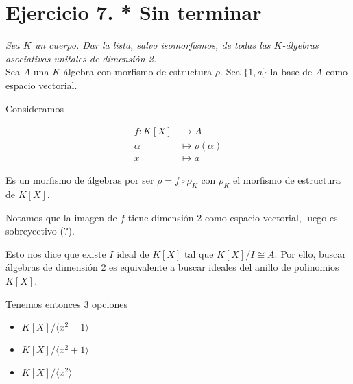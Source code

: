 \section{Ejercicio 7. * Sin terminar} \emph{Sea \(K\) un cuerpo. Dar la lista, salvo isomorfismos, de
todas las \(K\)-álgebras asociativas unitales de dimensión 2.}\\

Sea \(A\) una \(K\)-álgebra con morfismo de estructura \(\rho\). Sea \(\{1,
a\}\) la base de \(A\) como espacio vectorial.


Consideramos

\[
  \begin{aligned}
    f:K[X] &\to A \\
    \alpha &\mapsto \rho(\alpha)\\
    x &\mapsto a
  \end{aligned}
\]

Es un morfismo de álgebras por ser \(\rho = f \circ \rho_K\) con \(\rho_K\) el
morfismo de estructura de \(K[X]\).

Notamos que la imagen de \(f\) tiene dimensión 2 como espacio vectorial, luego
es sobreyectivo (?).

Esto nos dice que existe \(I\) ideal de \(K[X]\) tal que \(K[X]/I \cong A\). Por
ello, buscar álgebras de dimensión 2 es equivalente a buscar ideales del anillo
de polinomios \(K[X]\).

Tenemos entonces 3 opciones
\begin{itemize}
\item \(K[X]/\langle x^2-1 \rangle\)
\item \(K[X]/\langle x^2+1\rangle\)
\item \(K[X]/\langle x^2\rangle\)
\end{itemize}
